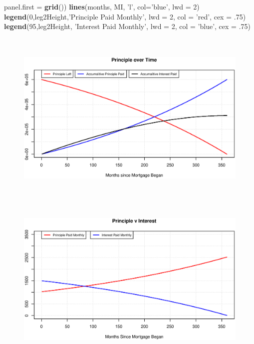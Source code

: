 \documentclass[12pt]{article}
\newenvironment{Section}[1]{}{\newpage}
\newenvironment{Shaded}{\begin{snugshade}}{\end{snugshade}}
\newcommand{\DataTypeTok}[1]{\textcolor[rgb]{0.13,0.29,0.53}{#1}}
\newcommand{\DecValTok}[1]{\textcolor[rgb]{0.00,0.00,0.81}{#1}}
\newcommand{\FloatTok}[1]{\textcolor[rgb]{0.00,0.00,0.81}{#1}}
\newcommand{\KeywordTok}[1]{\textcolor[rgb]{0.13,0.29,0.53}{\textbf{#1}}}
\newcommand{\NormalTok}[1]{#1}
\newcommand{\StringTok}[1]{\textcolor[rgb]{0.31,0.60,0.02}{#1}}
\begin{document}
\begin{Section}{Example A}
\begin{singlespace}
\begin{Shaded}
\begin{Highlighting}[]
      \DataTypeTok{panel.first =} \KeywordTok{grid}\NormalTok{())}
\KeywordTok{lines}\NormalTok{(months, MI, }\StringTok{'l'}\NormalTok{, }\DataTypeTok{col=}\StringTok{'blue'}\NormalTok{, }\DataTypeTok{lwd =} \DecValTok{2}\NormalTok{)}
\KeywordTok{legend}\NormalTok{(}\DecValTok{0}\NormalTok{,leg2Height,}\StringTok{'Principle Paid Monthly'}\NormalTok{, }\DataTypeTok{lwd =} \DecValTok{2}\NormalTok{, }
      \DataTypeTok{col =} \StringTok{'red'}\NormalTok{, }\DataTypeTok{cex =} \FloatTok{.75}\NormalTok{)}
\KeywordTok{legend}\NormalTok{(}\DecValTok{95}\NormalTok{,leg2Height, }\StringTok{'Interest Paid Monthly'}\NormalTok{, }\DataTypeTok{lwd =} \DecValTok{2}\NormalTok{, }
      \DataTypeTok{col =} \StringTok{'blue'}\NormalTok{, }\DataTypeTok{cex =} \FloatTok{.75}\NormalTok{)}
\end{Highlighting}
\end{Shaded}
\end{singlespace}
		\begin{figure}[h!]
			\centering
			\includegraphics[width = \linewidth, height = 8.4cm]{Figures/POT.C740.S100.T30}
			\includegraphics[width = \linewidth, height = 8.4cm]{Figures/PVT.C740.S100.T30}
		\end{figure}
	\end{Section}
\end{document}
